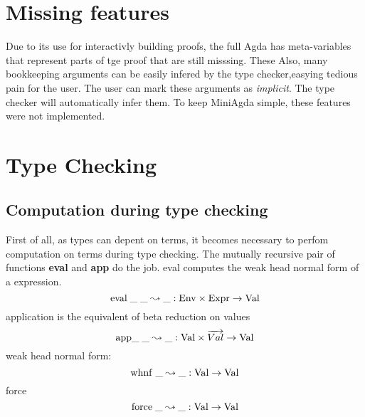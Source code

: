 \section{Missing features}
Due to its use for interactivly building proofs, the full Agda has meta-variables that represent parts of tge proof that are still misssing. These 
Also, many bookkeeping arguments can be easily infered by the type checker,easying tedious pain for the user.
The user can mark these arguments as \emph{implicit}. The type checker will automatically infer them.
To keep MiniAgda simple, these features were not implemented.

\section{Type Checking}

\renewcommand\Check[4]{#1,#2\;\vdash\;#3\uparrow#4}
\newcommand\Infer[4]{#1,#2\;\vdash\;#3\downarrow#4}
\newcommand\IsType[3]{#1,#2\;\vdash\;#3\uparrow\Set}
\newcommand\EqVal[2]{\vdash\;#1\leftrightarrow#2}
\newcommand\Eval[3]{\mathrm{eval}\;#1\;#2\leadsto#3}
\newcommand\App[3]{\mathrm{app}#1\;#2\leadsto#3}
\newcommand\AppFun[3]{\mathrm{appFun}\;#1,#2,\leadsto#3}
\newcommand\Fapp[6]{\mathrm{fapp}\;#1,#2,#3,#4,#5\leadsto#6}
\newcommand\Whnf[2]{\mathrm{whnf}\;#1\leadsto#2}
\newcommand\Force[2]{\mathrm{force}\;#1\leadsto#2}
\newcommand\Lookup[3]{#1(#2) = #3}
\newcommand\LeqVal[2]{\vdash\;#1\leq#2}

\subsection{Computation during type checking}
First of all, as types can depent on terms, it becomes necessary to perfom computation on terms during type checking.
The mutually recursive pair of functions 
\textbf{eval} and \textbf{app} do the job.
eval computes the weak head normal form of a expression.
\[\Eval{\_}{\_}{\_} : \Env \times \Expr \ra \Val \]
application is the equivalent of beta reduction on values
\[\App{\_}{\_}{\_} : \Val \times \vec{Val} \ra \Val\]
weak head normal form: 
\[\Whnf{\_}{\_} : \Val \ra \Val\]
force
\[\Force{\_}{\_} : \Val \ra \Val \] 

